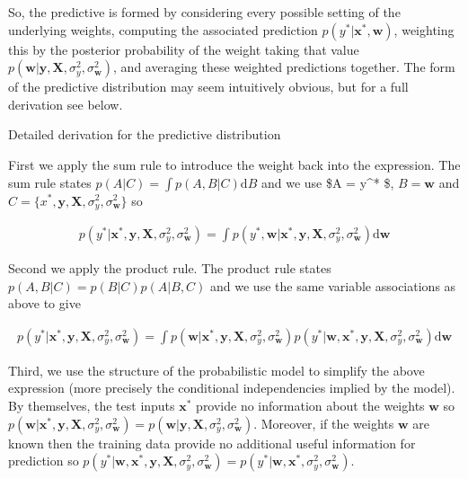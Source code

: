 \documentclass[11pt]{article}
\begin{document}
So, the predictive is formed by considering every possible setting of
the underlying weights, computing the associated prediction
\(p(y^* | \mathbf{x}^*, \mathbf{w})\), weighting this by the posterior
probability of the weight taking that value
\(p(\mathbf{w}|\mathbf{y},\mathbf{X},\sigma_y^2,\sigma_{\mathbf{w}}^2)\),
and averaging these weighted predictions together. The form of the
predictive distribution may seem intuitively obvious, but for a full
derivation see below.

 Detailed derivation for the predictive distribution

First we apply the sum rule to introduce the weight back into the
expression. The sum rule states \(p(A|C) = \int p(A,B|C) \text{d}B\) and
we use \$A = y\^{}* \$, \(B = \mathbf{w}\) and
\(C = \{x^*, \mathbf{y},\mathbf{X},\sigma_y^2,\sigma_{\mathbf{w}}^2\}\)
so

\begin{align}
p(y^* | \mathbf{x}^*, \mathbf{y},\mathbf{X},\sigma_y^2,\sigma_{\mathbf{w}}^2)  = \int p(y^*,\mathbf{w} | \mathbf{x}^*, \mathbf{y},\mathbf{X},\sigma_y^2,\sigma_{\mathbf{w}}^2) \mathrm{d} \mathbf{w} 
\end{align}

Second we apply the product rule. The product rule states
\(p(A,B|C) = p(B|C)p(A|B,C)\) and we use the same variable associations
as above to give

\begin{align}
p(y^* | \mathbf{x}^*, \mathbf{y},\mathbf{X},\sigma_y^2,\sigma_{\mathbf{w}}^2)  = \int p( \mathbf{w} | \mathbf{x}^*, \mathbf{y},\mathbf{X},\sigma_y^2,\sigma_{\mathbf{w}}^2) p(y^* | \mathbf{w} , \mathbf{x}^*, \mathbf{y},\mathbf{X},\sigma_y^2,\sigma_{\mathbf{w}}^2) \mathrm{d} \mathbf{w} 
\end{align}

Third, we use the structure of the probabilistic model to simplify the
above expression (more precisely the conditional independencies implied
by the model). By themselves, the test inputs \(\mathbf{x}^*\) provide
no information about the weights \(\mathbf{w}\) so
\(p( \mathbf{w} | \mathbf{x}^*, \mathbf{y},\mathbf{X},\sigma_y^2,\sigma_{\mathbf{w}}^2) = p( \mathbf{w} | \mathbf{y},\mathbf{X},\sigma_y^2,\sigma_{\mathbf{w}}^2)\).
Moreover, if the weights \(\mathbf{w}\) are known then the training data
provide no additional useful information for prediction so
\(p(y^* | \mathbf{w} , \mathbf{x}^*, \mathbf{y},\mathbf{X},\sigma_y^2,\sigma_{\mathbf{w}}^2) = p(y^* | \mathbf{w} , \mathbf{x}^*, \sigma_y^2,\sigma_{\mathbf{w}}^2)\).
\end{document}
